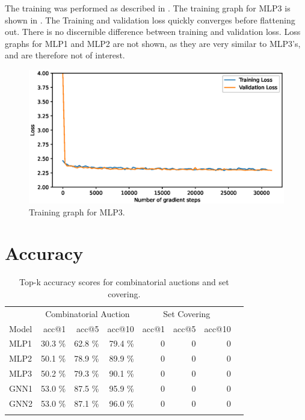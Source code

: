 The training was performed as described in . 
The training graph for MLP3 is shown in . The Training and validation loss quickly converges before flattening out. There is no discernible difference between training and validation loss. Loss graphs for MLP1 and MLP2 are not shown, as they are very similar to MLP3's, and are therefore not of interest. 
%
\begin{figure}[h]
    \centering
    \includegraphics[width=\textwidth]{img/loss70.eps}
    \caption{Training graph for MLP3.}
    \label{fig:training}
\end{figure}


\section{Accuracy}


\begin{scriptsize}
\begin{table}[ht]
	\centering
	\begin{tabular}{lrrrrrrr}
		\toprule
		& \multicolumn{3}{c}{Combinatorial Auction} & \multicolumn{3}{c}{Set Covering}\\ 
		\cmidrule(lr){2-4} \cmidrule(lr){5-7}
		Model & acc@1 & acc@5 & acc@10 & acc@1 & acc@5 & acc@10 \\
		\midrule
		MLP1 & 30.3 \% & 62.8 \% & 79.4 \% & 0 & 0 & 0\\
		MLP2 & 50.1 \% & 78.9 \% & 89.9 \% & 0 & 0 & 0\\
		MLP3 & 50.2 \% & 79.3 \% & 90.1 \% & 0 & 0 & 0\\
		GNN1 & 53.0 \% & 87.5 \% & 95.9 \% & 0 & 0 & 0\\
		GNN2 & 53.0 \% & 87.1 \% & 96.0 \% & 0 & 0 & 0\\
		\addlinespace
		\bottomrule
	\end{tabular}
	\caption{Top-k accuracy scores for combinatorial auctions and set covering.}\label{tab:results1_set}
\end{table}
\end{scriptsize}

